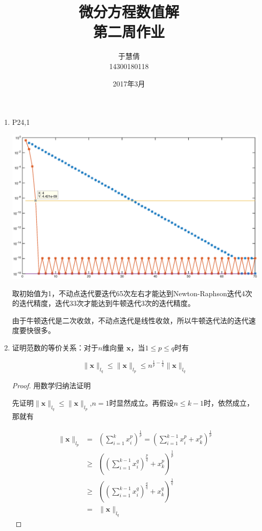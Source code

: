 \documentclass{ctexart}
\title{微分方程数值解 \\ 第二周作业}
\author{于慧倩 \\ 14300180118}
\date{2017年3月}
\begin{document}
\maketitle

\newpage

\begin{enumerate}

\item P24,1

\centerline{\includegraphics[width=5.5in]{1.eps}}

取初始值为1，不动点迭代要迭代65次左右才能达到Newton-Raphson迭代4次的迭代精度，迭代33次才能达到牛顿迭代3次的迭代精度。

由于牛顿迭代是二次收敛，不动点迭代是线性收敛，所以牛顿迭代法的迭代速度要快很多。



\item 证明范数的等价关系：对于\(n\)维向量 \( \bm{x}\)，当\(1 \leq p \leq q\)时有

\[
\| \bm{x} \|_{l_q} \leq \| \bm{x} \|_{l_p} \leq n^{ \frac{1}{p} - \frac{1}{q}} \| \bm{x} \|_{l_q}
\]

\begin{proof}

用数学归纳法证明


先证明\( \| \bm{x} \|_{l_q} \leq \| \bm{x} \|_{l_p} \),\(n=1\)时显然成立。再假设\(n \leq k-1\)时，依然成立，那就有

\begin{eqnarray*}
\|\bm{x}\|_{l_p} &=& (\sum_{i=1}^k x_i^p)^{\frac{1}{p}} =(\sum_{i=1}^{k-1} x_i^p+x^p_k)^{\frac{1}{p}} \nonumber \\
& \geq& ((\sum_{i=1}^{k-1} x_i^q)^{ \frac{p}{q} } + x_k^p)^{\frac{1}{p}} \nonumber \\
& \geq & ((\sum_{i=1}^{k-1} x_i^q)^{ \frac{q}{q} } +x_k^q)^{\frac{1}{q}} \nonumber \\
& =& \|\bm{x}\|_{l_q}
\end{eqnarray*}




\end{proof}
\end{enumerate}
\end{document}
